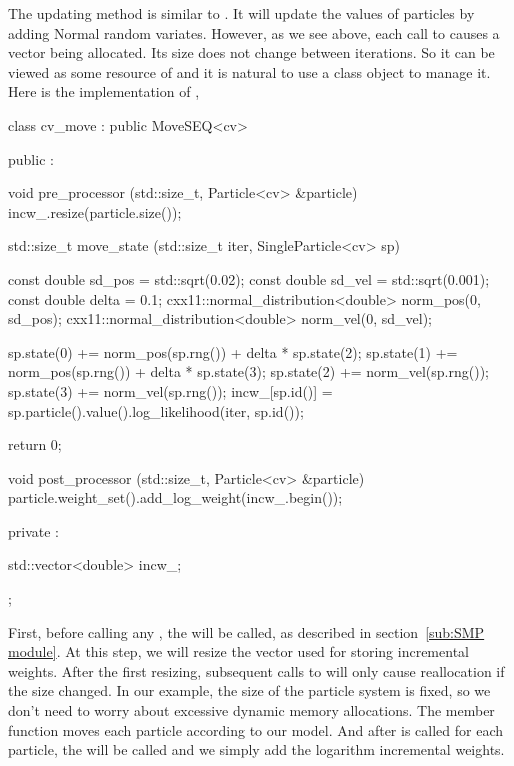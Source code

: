 \documentclass[11pt, fontset=Minion, showoverfull,
bib, mintcode, minted=cache]{marticle}
\begin{document}
The updating method  is similar to . It
will update the values of particles by adding Normal random variates. However,
as we see above, each call to  causes a
 vector being allocated. Its size does not change
between iterations. So it can be viewed as some resource of
 and it is natural to use a class object to manage it. Here
is the implementation of ,
\begin{cppcode}
class cv_move : public MoveSEQ<cv>
{
    public :

    void pre_processor (std::size_t, Particle<cv> &particle)
    {incw_.resize(particle.size());}

    std::size_t move_state (std::size_t iter, SingleParticle<cv> sp)
    {
        const double sd_pos = std::sqrt(0.02);
        const double sd_vel = std::sqrt(0.001);
        const double delta = 0.1;
        cxx11::normal_distribution<double> norm_pos(0, sd_pos);
        cxx11::normal_distribution<double> norm_vel(0, sd_vel);

        sp.state(0) += norm_pos(sp.rng()) + delta * sp.state(2);
        sp.state(1) += norm_pos(sp.rng()) + delta * sp.state(3);
        sp.state(2) += norm_vel(sp.rng());
        sp.state(3) += norm_vel(sp.rng());
        incw_[sp.id()] = sp.particle().value().log_likelihood(iter, sp.id());

        return 0;
    }

    void post_processor (std::size_t, Particle<cv> &particle)
    {particle.weight_set().add_log_weight(incw_.begin());}

    private :

    std::vector<double> incw_;
};
\end{cppcode}
First, before calling any , the
 will be called, as described in section~\ref{sub:SMP
  module}. At this step, we will resize the vector used for storing
incremental weights. After the first resizing, subsequent calls to
 will only cause reallocation if the size changed. In our
example, the size of the particle system is fixed, so we don't need to worry
about excessive dynamic memory allocations. The  member
function moves each particle according to our model. And after
 is called for each particle, the
 will be called and we simply add the logarithm
incremental weights.
\end{document}
